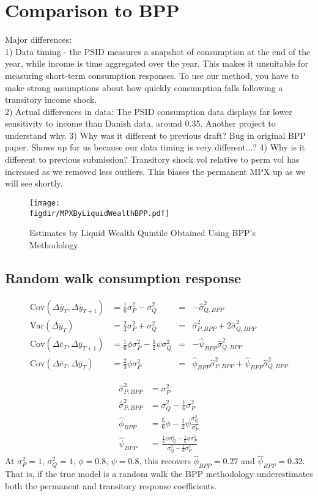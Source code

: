 \documentclass[12pt]{article}
\newcommand{\figdir}{../../Code/Rcode/Figures/AEJ_revision}
\begin{document}
\section{Comparison to BPP}
Major differences:\\
1) Data timing - the PSID measures a snapshot of consumption at the end of the year, while income is time aggregated over the year. This makes it unsuitable for measuring short-term consumption responses. To use our method, you have to make strong assumptions about how quickly consumption falls following a transitory income shock.\\
2) Actual differences in data: The PSID consumption data displays far lower sensitivity to income than Danish data, around 0.35. Another project to understand why.
3) Why was it different to previous draft? Bug in original BPP paper. Shows up for us because our data timing is very different...?
4) Why is it different to previous submission? Transitory shock vol relative to perm vol has increased as we removed less outliers. This biases the permanent MPX up as we will see shortly.
	\begin{figure} 
	\begin{centering}
		\texttt{[image: \\figdir/MPXByLiquidWealthBPP.pdf]}
		\caption{Estimates by Liquid Wealth Quintile Obtained Using BPP's Methodology}
		\label{fig:BPP_liquid}
	\end{centering}
\end{figure}
\subsection{Random walk consumption response}
\begin{align*}
	\mathrm{Cov}(\Delta \bar{y}_T, \Delta \bar{y}_{T+1}) &= \frac{1}{6} \sigma^2_P - \sigma^2_Q &= &-\hat{\sigma}^2_{Q,BPP} \\
	\mathrm{Var}(\Delta \bar{y}_T) &= \frac{2}{3} \sigma^2_P + \sigma^2_Q &= &\hat{\sigma}^2_{P,BPP} + 2\hat{\sigma}^2_{Q,BPP} \\
	\mathrm{Cov}(\Delta \bar{c}_T, \Delta \bar{y}_{T+1}) &= \frac{1}{6} \phi \sigma^2_P  - \frac{1}{2}\psi \sigma^2_Q &= &-\hat{\psi}_{BPP} \hat{\sigma}^2_{Q,BPP} \\
	\mathrm{Cov}(\Delta \bar{c}_T, \Delta \bar{y}_T) &= \frac{2}{3} \phi \sigma^2_P  &= &\hat{\phi}_{BPP}\hat{\sigma}^2_{P,BPP} +\hat{\psi}_{BPP}\hat{\sigma}^2_{Q,BPP}
\end{align*}

\begin{align*}
	\hat{\sigma}^2_{P,BPP} &= \sigma^2_P \\
	\hat{\sigma}^2_{P,BPP} &= \sigma^2_Q - \frac{1}{6}\sigma^2_P \\
	\hat{\phi}_{BPP} &=  \frac{5}{6}\phi - \frac{1}{2}\psi\frac{\sigma^2_Q}{\sigma^2_P} \\
	\hat{\psi}_{BPP} &=  \frac{  \frac{1}{2}\psi \sigma^2_Q - \frac{1}{6}\phi \sigma^2_P}{ \sigma^2_Q - \frac{1}{6} \sigma^2_P}
\end{align*}
At $\sigma^2_P=1$, $\sigma^2_Q=1$, $\phi=0.8$, $\psi=0.8$, this recovers $\hat{\phi}_{BPP}=0.27$ and $\hat{\psi}_{BPP}=0.32$. That is, if the true model is a random walk the BPP methodology underestimates both the permanent and transitory response coefficients.
\end{document}
